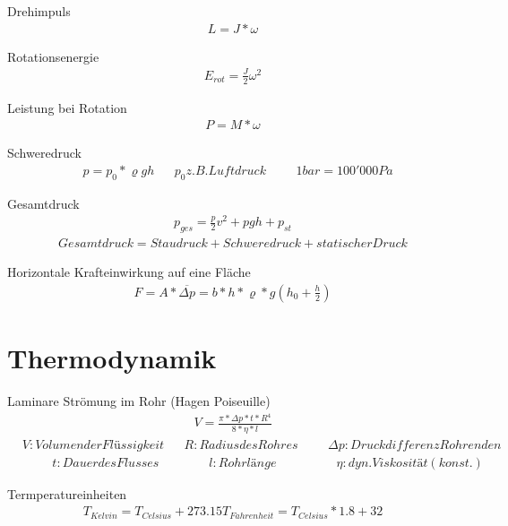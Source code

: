 \documentclass[17pt]{extarticle}
\begin{document}
	Drehimpuls 
	\begin{align}
		L = J * \omega
	\end{align}
	
	Rotationsenergie
	\begin{align}
		E_{rot} = \frac{J}{2} \omega^2
	\end{align}
	
	Leistung bei Rotation
	\begin{align}
		P = M * \omega
	\end{align}
	
	Schweredruck 
	\begin{align}
		&p = p_0 * \varrho g h
		&&p_0 z.B. Luftdruck 
		&&&1 bar = 100'000 Pa
	\end{align}
	
	Gesamtdruck
	\begin{align}
		p_{ges} = \frac{p}{2}v^2 + pgh + p_{st}
	\end{align}
	\begin{align}		
		Gesamtdruck = Staudruck + Schweredruck + statischer Druck
	\end{align}

	Horizontale Krafteinwirkung auf eine Fläche
	\begin{align}
		F = A * \overline{\Delta p} = b*h * \varrho*g (h_{0} + \frac{h}{2})
	\end{align}
	
	
\section{Thermodynamik}
	Laminare Strömung im Rohr (Hagen Poiseuille)
	\begin{align}
		V = \frac{\pi * \Delta p * t * R^4}{8 * \eta * l}
	\end{align}
	\begin{align}
		&V: Volumen der Flüssigkeit
		&&R: Radius des Rohres
		&&&\Delta p: Druckdifferenz Rohrenden
	\end{align}
	\begin{align}
		&&&&t: Dauer des Flusses
		&&&&&l: Rohrlänge
		&&&&&&\eta: dyn. Viskosität (konst.)
	\end{align}

	Termperatureinheiten
	\begin{align}
		T_{Kelvin} = T_{Celsius} + 273.15
		T_{Fahrenheit} = T_{Celsius} * 1.8 + 32
	\end{align}
\end{document}
